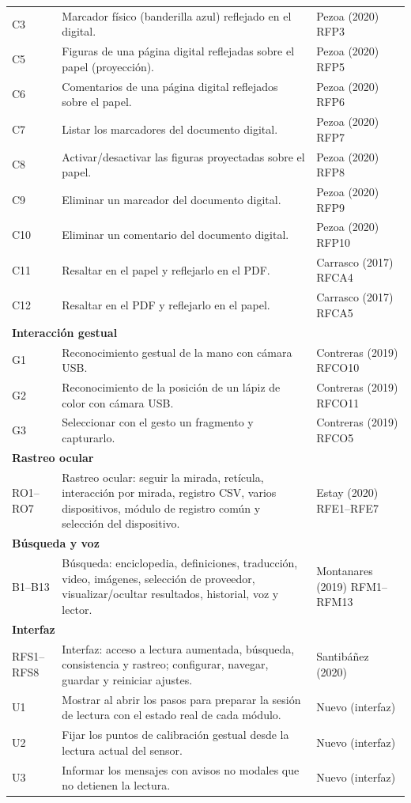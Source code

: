 \begin{longtable}{p{2.1cm} p{8.6cm} p{3.6cm}}
C3 & Marcador físico (banderilla azul) reflejado en el digital. & Pezoa (2020) RFP3 \\
C5 & Figuras de una página digital reflejadas sobre el papel (proyección). & Pezoa (2020) RFP5 \\
C6 & Comentarios de una página digital reflejados sobre el papel. & Pezoa (2020) RFP6 \\
C7 & Listar los marcadores del documento digital. & Pezoa (2020) RFP7 \\
C8 & Activar/desactivar las figuras proyectadas sobre el papel. & Pezoa (2020) RFP8 \\
C9 & Eliminar un marcador del documento digital. & Pezoa (2020) RFP9 \\
C10 & Eliminar un comentario del documento digital. & Pezoa (2020) RFP10 \\
C11 & Resaltar en el papel y reflejarlo en el PDF. & Carrasco (2017) RFCA4 \\
C12 & Resaltar en el PDF y reflejarlo en el papel. & Carrasco (2017) RFCA5 \\
\midrule
\multicolumn{3}{l}{\textbf{Interacción gestual}} \\
G1 & Reconocimiento gestual de la mano con cámara USB. & Contreras (2019) RFCO10 \\
G2 & Reconocimiento de la posición de un lápiz de color con cámara USB. & Contreras (2019) RFCO11 \\
G3 & Seleccionar con el gesto un fragmento y capturarlo. & Contreras (2019) RFCO5 \\
\midrule
\multicolumn{3}{l}{\textbf{Rastreo ocular}} \\
RO1–RO7 & Rastreo ocular: seguir la mirada, retícula, interacción por mirada, registro CSV, varios dispositivos, módulo de registro común y selección del dispositivo. & Estay (2020) RFE1–RFE7 \\
\midrule
\multicolumn{3}{l}{\textbf{Búsqueda y voz}} \\
B1–B13 & Búsqueda: enciclopedia, definiciones, traducción, video, imágenes, selección de proveedor, visualizar/ocultar resultados, historial, voz y lector. & Montanares (2019) RFM1–RFM13 \\
\midrule
\multicolumn{3}{l}{\textbf{Interfaz}} \\
RFS1–RFS8 & Interfaz: acceso a lectura aumentada, búsqueda, consistencia y rastreo; configurar, navegar, guardar y reiniciar ajustes. & Santibáñez (2020) \\
U1 & Mostrar al abrir los pasos para preparar la sesión de lectura con el estado real de cada módulo. & Nuevo (interfaz) \\
U2 & Fijar los puntos de calibración gestual desde la lectura actual del sensor. & Nuevo (interfaz) \\
U3 & Informar los mensajes con avisos no modales que no detienen la lectura. & Nuevo (interfaz) \\
\end{longtable}
